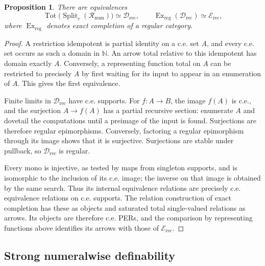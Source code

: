 \documentclass[11pt]{article}
\newtheorem{proposition}[theorem]{Proposition}
\theoremstyle{definition}
\theoremstyle{remark}
\begin{document}
\begin{proposition}\label{prop:numerical-exact-completion}
There are equivalences
\[
 \operatorname{Tot}\bigl(\operatorname{Split}_r
       (\mathcal R_{\mathrm{num}})\bigr)
       \simeq\mathcal D_{\mathrm{rec}},
 \qquad
 \operatorname{Ex}_{\mathrm{reg}}(\mathcal D_{\mathrm{rec}})
       \simeq\mathcal E_{\mathrm{rec}},
\]
where $\operatorname{Ex}_{\mathrm{reg}}$ denotes exact completion
of a regular category.
\end{proposition}
\begin{proof}
A restriction idempotent is partial identity on a c.e. set $A$,
and every c.e. set occurs as such a domain in $\mathbb N$.
An arrow total relative to this idempotent has domain exactly $A$.
Conversely, a representing function total on $A$ can be restricted to precisely
$A$ by first waiting for its input to appear in an enumeration
of $A$. This gives the first equivalence.

Finite limits in $\mathcal D_{\mathrm{rec}}$ have c.e. supports.
For $f:A\to B$, the image $f(A)$ is c.e., and the surjection
$A\to f(A)$ has a partial recursive section: enumerate $A$ and
dovetail the computations until a preimage of the input is found.
Surjections are therefore regular epimorphisms. Conversely,
factoring a regular epimorphism through its image shows that it
is surjective. Surjections are stable under pullback, so
$\mathcal D_{\mathrm{rec}}$ is regular.

Every mono is injective, as tested by maps from singleton supports,
and is isomorphic to the inclusion of its c.e. image; the inverse on that image is obtained by the
same search. Thus its internal equivalence relations are
precisely c.e. equivalence relations on c.e. supports.
The relation construction of exact completion
\cite{CarboniVitale} has these as objects and saturated total
single-valued relations as arrows. Its objects are therefore
c.e. PERs, and the comparison by representing functions above identifies its
arrows with those of $\mathcal E_{\mathrm{rec}}$.
\end{proof}

\subsection{Strong numeralwise definability}
\end{document}
